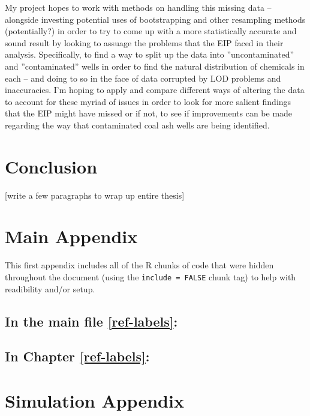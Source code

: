 \documentclass[12pt, twoside]{amherstthesis}
\begin{document}
My project hopes to work with methods on handling this missing data -- alongside investing potential uses of bootstrapping and other resampling methods (potentially?) in order to try to come up with a more statistically accurate and sound result by looking to assuage the problems that the EIP faced in their analysis. Specifically, to find a way to split up the data into ''uncontaminated'' and ''contaminated'' wells in order to find the natural distribution of chemicals in each -- and doing to so in the face of data corrupted by LOD problems and inaccuracies. I'm hoping to apply and compare different ways of altering the data to account for these myriad of issues in order to look for more salient findings that the EIP might have missed or if not, to see if improvements can be made regarding the way that contaminated coal ash wells are being identified.

\hypertarget{conclusion}{%
\chapter{Conclusion}\label{conclusion}}

{[}write a few paragraphs to wrap up entire thesis{]}

\appendix

\hypertarget{main-appendix}{%
\chapter{Main Appendix}\label{main-appendix}}

This first appendix includes all of the R chunks of code that were hidden throughout the document (using the \texttt{include\ =\ FALSE} chunk tag) to help with readibility and/or setup.

\hypertarget{in-the-main-file-refref-labels}{%
\section{In the main file \ref{ref-labels}:}\label{in-the-main-file-refref-labels}}

\hypertarget{in-chapter-refref-labels}{%
\section{In Chapter \ref{ref-labels}:}\label{in-chapter-refref-labels}}

\hypertarget{simulation-appendix}{%
\chapter{Simulation Appendix}\label{simulation-appendix}}
\end{document}

